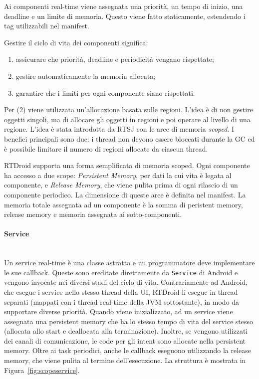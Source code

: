 Ai componenti real-time viene assegnata una priorità, un tempo di inizio, una deadline e un limite di memoria. Questo viene fatto staticamente, estendendo i tag utilizzabili nel manifest.

Gestire il ciclo di vita dei componenti significa: 
\begin{enumerate}
	\item assicurare che priorità, deadline e periodicità vengano rispettate;
	\item gestire automaticamente la memoria allocata;
	\item garantire che i limiti per ogni componente siano rispettati.
\end{enumerate}
Per (2) viene utilizzata un'allocazione basata sulle regioni. L'idea è di non gestire oggetti singoli, ma di allocare gli oggetti in regioni e poi operare al livello di una regione. L'idea è stata introdotta da RTSJ con le aree di memoria \textit{scoped}. I benefici principali sono due: i thread non devono essere bloccati durante la GC ed è possibile limitare il numero di regioni allocate da ciascun thread.

RTDroid supporta una forma semplificata di memoria scoped. Ogni componente ha accesso a due scope: \textit{Persistent Memory}, per dati la cui vita è legata al componente, e \textit{Release Memory}, che viene pulita prima di ogni rilascio di un componente periodico. La dimensione di queste aree è definita nel manifest. La memoria totale assegnata ad un componente è la somma di peristent memory, release memory e memoria assegnata ai sotto-componenti.

\paragraph{Service} \mbox{} \\
Un service real-time è una classe astratta e un programmatore deve implementare le sue callback. Queste sono ereditate direttamente da \texttt{Service} di Android e vengono invocate nei diversi stadi del ciclo di vita. Contrariamente ad Android, che esegue i service nello stesso thread della UI, RTDroid li esegue in thread separati (mappati con i thread real-time della JVM sottostante), in modo da supportare diverse priorità. Quando viene inizializzato, ad un service viene assegnata una persistent memory che ha lo stesso tempo di vita del service stesso (allocata allo start e deallocata alla terminazione). Inoltre, se vengono utilizzati dei canali di comunicazione, le code per gli intent sono allocate nella persistent memory. Oltre ai task periodici, anche le callback eseguono utilizzando la release memory, che viene pulita al termine dell'esecuzione. La struttura è mostrata in Figura~\ref{fig:scopeservice}.

